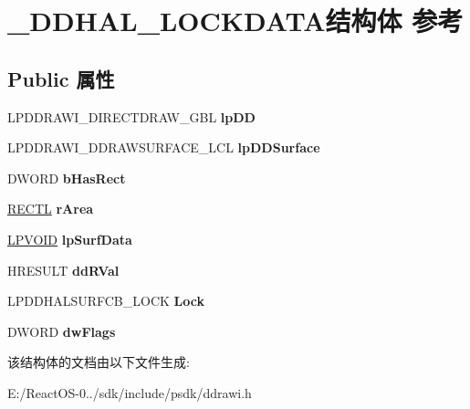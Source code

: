 \hypertarget{struct___d_d_h_a_l___l_o_c_k_d_a_t_a}{}\section{\+\_\+\+D\+D\+H\+A\+L\+\_\+\+L\+O\+C\+K\+D\+A\+T\+A结构体 参考}
\label{struct___d_d_h_a_l___l_o_c_k_d_a_t_a}
\subsection*{Public 属性}
\begin{DoxyCompactItemize}
\item 
\mbox{\label{struct___d_d_h_a_l___l_o_c_k_d_a_t_a_acf666a087d61ceaa6990968849b8de79}} 
L\+P\+D\+D\+R\+A\+W\+I\+\_\+\+D\+I\+R\+E\+C\+T\+D\+R\+A\+W\+\_\+\+G\+BL {\bfseries lp\+DD}
\item 
\mbox{\label{struct___d_d_h_a_l___l_o_c_k_d_a_t_a_afdb563d38aa6bfdc379454547e112180}} 
L\+P\+D\+D\+R\+A\+W\+I\+\_\+\+D\+D\+R\+A\+W\+S\+U\+R\+F\+A\+C\+E\+\_\+\+L\+CL {\bfseries lp\+D\+D\+Surface}
\item 
\mbox{\label{struct___d_d_h_a_l___l_o_c_k_d_a_t_a_a373a60b1aebc67e02dbe7bf1a98af252}} 
D\+W\+O\+RD {\bfseries b\+Has\+Rect}
\item 
\mbox{\label{struct___d_d_h_a_l___l_o_c_k_d_a_t_a_a2d421ffe2b7d3af3ae1502f4110cc46e}} 
\hyperlink{struct___r_e_c_t_l}{R\+E\+C\+TL} {\bfseries r\+Area}
\item 
\mbox{\label{struct___d_d_h_a_l___l_o_c_k_d_a_t_a_af80cb52ab6670f7a9458d0e628943546}} 
\hyperlink{interfacevoid}{L\+P\+V\+O\+ID} {\bfseries lp\+Surf\+Data}
\item 
\mbox{\label{struct___d_d_h_a_l___l_o_c_k_d_a_t_a_ab9a9340cb26befe64221df9ef3d1473c}} 
H\+R\+E\+S\+U\+LT {\bfseries dd\+R\+Val}
\item 
\mbox{\label{struct___d_d_h_a_l___l_o_c_k_d_a_t_a_aec0936639e99786eb303727e98f91648}} 
L\+P\+D\+D\+H\+A\+L\+S\+U\+R\+F\+C\+B\+\_\+\+L\+O\+CK {\bfseries Lock}
\item 
\mbox{\label{struct___d_d_h_a_l___l_o_c_k_d_a_t_a_ab5ccdd6af219edd3136469e193a25864}} 
D\+W\+O\+RD {\bfseries dw\+Flags}
\end{DoxyCompactItemize}


该结构体的文档由以下文件生成\+:\begin{DoxyCompactItemize}
\item 
E\+:/\+React\+O\+S-\/0../sdk/include/psdk/ddrawi.\+h\end{DoxyCompactItemize}
